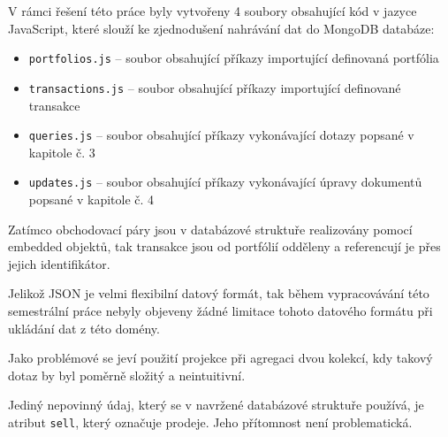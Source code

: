 \documentclass[12pt, a4paper]{article}
\begin{document}
V rámci řešení této práce byly vytvořeny 4 soubory obsahující kód v jazyce JavaScript, které slouží ke zjednodušení nahrávání dat do MongoDB databáze:

\begin{itemize}
    \item \texttt{portfolios.js} -- soubor obsahující příkazy importující definovaná portfólia
    \item \texttt{transactions.js} -- soubor obsahující příkazy importující definované transakce
    \item \texttt{queries.js} -- soubor obsahující příkazy vykonávající dotazy popsané v kapitole č. 3
    \item \texttt{updates.js} -- soubor obsahující příkazy vykonávající úpravy dokumentů popsané v kapitole č. 4
\end{itemize}

Zatímco obchodovací páry jsou v databázové struktuře realizovány pomocí embedded objektů, tak transakce jsou od portfólií odděleny a referencují je přes jejich identifikátor.

Jelikož JSON je velmi flexibilní datový formát, tak během vypracovávání této semestrální práce nebyly objeveny žádné limitace tohoto datového formátu při ukládání dat z této domény.

Jako problémové se jeví použití projekce při agregaci dvou kolekcí, kdy takový dotaz by byl poměrně složitý a neintuitivní.

Jediný nepovinný údaj, který se v navržené databázové struktuře používá, je atribut \texttt{sell}, který označuje prodeje. Jeho přítomnost není problematická.
\end{document}
